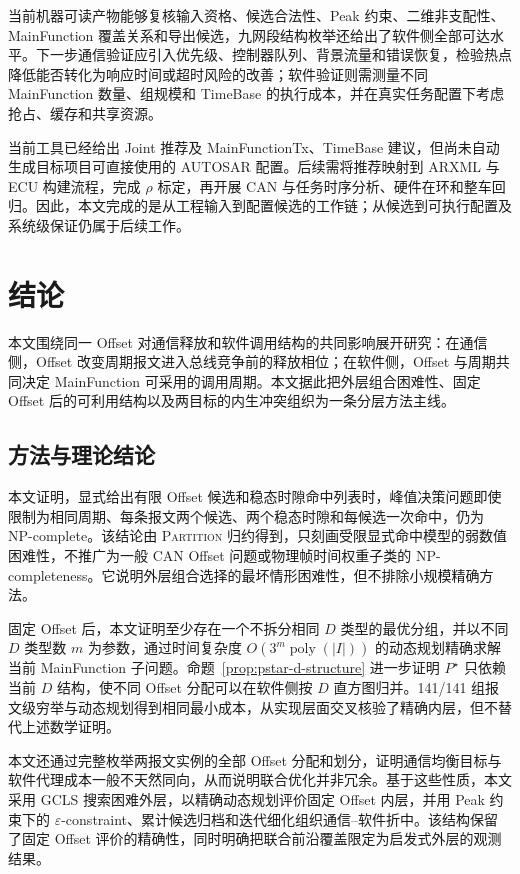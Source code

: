 \documentclass[UTF8,a4paper,twoside,zihao=-4]{ctexart}
\numberwithin{equation}{section}
\numberwithin{figure}{section}
\numberwithin{table}{section}
\theoremstyle{definition}
\numberwithin{algocf}{section}
\begin{document}
当前机器可读产物能够复核输入资格、候选合法性、Peak 约束、二维非支配性、MainFunction 覆盖关系和导出候选，九网段结构枚举还给出了软件侧全部可达水平。下一步通信验证应引入优先级、控制器队列、背景流量和错误恢复，检验热点降低能否转化为响应时间或超时风险的改善；软件验证则需测量不同 MainFunction 数量、组规模和 TimeBase 的执行成本，并在真实任务配置下考虑抢占、缓存和共享资源。

当前工具已经给出 Joint 推荐及 MainFunctionTx、TimeBase 建议，但尚未自动生成目标项目可直接使用的 AUTOSAR 配置。后续需将推荐映射到 ARXML 与 ECU 构建流程，完成 $\rho$ 标定，再开展 CAN 与任务时序分析、硬件在环和整车回归。因此，本文完成的是从工程输入到配置候选的工作链；从候选到可执行配置及系统级保证仍属于后续工作。

\clearpage
\section{结论}
\label{sec:conclusion}

本文围绕同一 Offset 对通信释放和软件调用结构的共同影响展开研究：在通信侧，Offset 改变周期报文进入总线竞争前的释放相位；在软件侧，Offset 与周期共同决定 MainFunction 可采用的调用周期。本文据此把外层组合困难性、固定 Offset 后的可利用结构以及两目标的内生冲突组织为一条分层方法主线。

\subsection{方法与理论结论}
\label{subsec:conclusion-properties}

本文证明，显式给出有限 Offset 候选和稳态时隙命中列表时，峰值决策问题即使限制为相同周期、每条报文两个候选、两个稳态时隙和每候选一次命中，仍为 NP-complete。该结论由 \textsc{Partition} 归约得到，只刻画受限显式命中模型的弱数值困难性，不推广为一般 CAN Offset 问题或物理帧时间权重子类的 NP-completeness。它说明外层组合选择的最坏情形困难性，但不排除小规模精确方法。

固定 Offset 后，本文证明至少存在一个不拆分相同 $D$ 类型的最优分组，并以不同 $D$ 类型数 $m$ 为参数，通过时间复杂度 $O(3^m\operatorname{poly}(|I|))$ 的动态规划精确求解当前 MainFunction 子问题。命题~\ref{prop:pstar-d-structure} 进一步证明 $P^\star$ 只依赖当前 $D$ 结构，使不同 Offset 分配可以在软件侧按 $D$ 直方图归并。141/141 组报文级穷举与动态规划得到相同最小成本，从实现层面交叉核验了精确内层，但不替代上述数学证明。

本文还通过完整枚举两报文实例的全部 Offset 分配和划分，证明通信均衡目标与软件代理成本一般不天然同向，从而说明联合优化并非冗余。基于这些性质，本文采用 GCLS 搜索困难外层，以精确动态规划评价固定 Offset 内层，并用 Peak 约束下的 $\varepsilon$-constraint、累计候选归档和迭代细化组织通信--软件折中。该结构保留了固定 Offset 评价的精确性，同时明确把联合前沿覆盖限定为启发式外层的观测结果。
\end{document}
